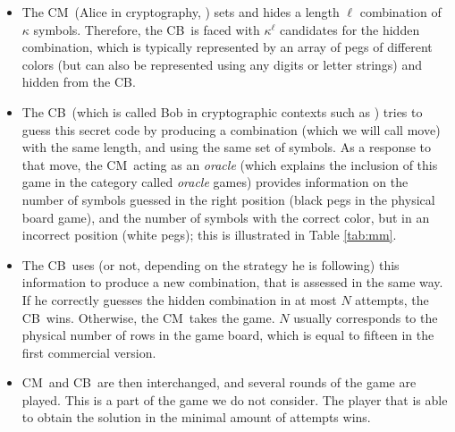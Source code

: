 \documentclass[preprint,12pt]{elsarticle}
\def\codemaker{CM}
\def\codebreaker{CB}
\begin{document}
\begin{itemize}

\item The \codemaker\  (Alice in cryptography, \cite{asuncion2010nonadaptive}) sets and hides a length $\ell$ combination of $\kappa$
  symbols. Therefore, the \codebreaker\ is faced with $\kappa^\ell$
  candidates for the hidden combination, which is typically
  represented by an array of pegs of different colors (but can also be
  represented using any digits or letter strings) and hidden from the
  \codebreaker. 

\item The \codebreaker\ (which is called Bob in cryptographic contexts
  such as \cite{DBLP:journals/corr/abs-0904-4458}) tries to guess this secret code by
  producing a combination (which we will call move) with the same length, and using the same set
  of symbols. As a response to that move, the \codemaker\, acting as an
      {\em oracle} (which explains the inclusion of this game in the
      category called {\em oracle} games)
  provides information on the number of symbols guessed in the right
  position (black pegs in the physical board game), and the number of
  symbols with the correct color, but in an incorrect position (white
  pegs); this is illustrated in Table \ref{tab:mm}.

\item The \codebreaker\  uses (or not, depending on the strategy he is
      following) this information to produce a new combination,
  that is assessed in the same way. If he correctly guesses
  the hidden combination in at most $N$ attempts, the \codebreaker\
      wins. Otherwise,  the \codemaker\ takes the game. $N$ usually
      corresponds to the 
      physical number of rows in the  game board, which is equal to
      fifteen in the first commercial version.

 \item \codemaker\ and \codebreaker\ are then interchanged, and several rounds of the game
       are played. This is a part of the game we do not
       consider. The player that is able to obtain the solution in the minimal amount
       of attempts wins. 

\end{itemize}
\end{document}
